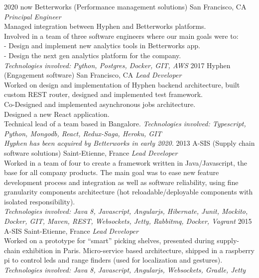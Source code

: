 \documentclass[]{k-cv} %
\begin{document}
\begin{entrylist}
\entry
{2020 \to now}
{Betterworks (Performance management solutions)}
{San Francisco, CA}
{\emph{Principal Engineer} \\
Managed integration between Hyphen and Betterworks platforms.\\
Involved in a team of three software engineers where our main goals were to:\\
- Design and implement new analytics tools in Betterworks app.\\
- Design the next gen analytics platform for the company.\\
\emph{
Technologies involved:
Python, Postgres, Docker, GIT, AWS
}}
\entry
{2017 }
{Hyphen (Engagement software)}
{San Francisco, CA}
{\emph{Lead Developer} \\
Worked on design and implementation of Hyphen backend architecture, built custom REST router, designed and implemented test framework.\\
Co-Designed and implemented asynchronous jobs architecture.\\
Designed a new React application.\\
Technical lead of a team based in Bangalore.
\emph{
Technologies involved:
Typescript, Python, Mongodb, React, Redux-Saga, Heroku, GIT
\\ Hyphen has been acquired by Betterworks in early 2020.
}}
\entry
{2013 }
{A-SIS (Supply chain software solutions)}
{Saint-Etienne, France}
{\emph{Lead Developer} \\
Worked in a team of four to create a framework written in Java/Javascript,
 the base for all company products.
The main goal was to ease new feature development process and integration as well as software reliability,
  using fine granularity components architecture (hot reloadable/deployable components with isolated responsibility). \\
\emph{
Technologies involved:
Java 8, Javascript, Angularjs, Hibernate, Junit, Mockito, Docker,
GIT, Maven, REST, Websockets, Jetty, Rabbitmq, Docker, Vagrant
}}
\entry
{2015}
{A-SIS}
{Saint-Etienne, France}
{\emph{Lead Developer} \\
Worked on a prototype for ``smart'' picking shelves, presented during supply-chain exhibition in Paris.
Micro-service based architecture, shipped in a raspberry pi to control leds and range finders
(used for localization and gestures). \\
\emph{
Technologies involved:
Java 8, Javascript, Angularjs, Websockets, Gradle, Jetty
}}
\end{entrylist}
\end{document}
